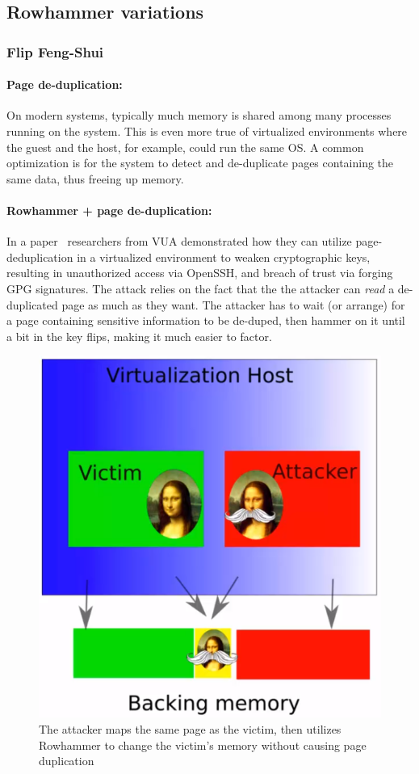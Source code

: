 \subsection{Rowhammer variations}\label{subsec:rowhammer_variations}
\subsubsection{Flip Feng-Shui}\label{subsubsec:flip_feng_shui}
\paragraph{Page de-duplication:} On modern systems, typically much memory is
shared among many processes running on the system. This is even more true of
virtualized environments where the guest and the host, for example, could run
the same OS\@. A common optimization is for the system to detect and
de-duplicate pages containing the same data, thus freeing up memory.
\paragraph{Rowhammer + page de-duplication:}
In a paper~\cite{ffs} researchers from VUA demonstrated how they can utilize
page-deduplication in a virtualized environment to weaken cryptographic keys,
resulting in unauthorized access via OpenSSH, and breach of trust via forging
GPG signatures. The attack relies on the fact that the the attacker can
\emph{read} a de-duplicated page as much as they want. The attacker has to wait
(or arrange) for a page containing sensitive information to be de-duped, then
hammer on it until a bit in the key flips, making it much easier to factor.
\begin{figure}[!ht]
	\centering
	\includegraphics[width=0.5\linewidth]{images/chapter_9/flip_feng_shui.PNG}
	\caption{The attacker maps the same page as the victim, then utilizes Rowhammer to change the victim's memory without causing page duplication}
	\label{fig:flip_feng_shui}
\end{figure}

